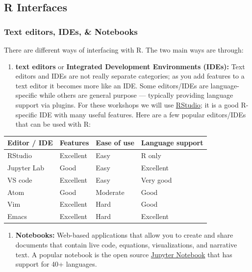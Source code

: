 \documentclass[]{book}
\providecommand{\tightlist}{%
  \setlength{\itemsep}{0pt}\setlength{\parskip}{0pt}}
\begin{document}
\hypertarget{r-interfaces}{%
\subsection{R Interfaces}\label{r-interfaces}}

\hypertarget{text-editors-ides-notebooks}{%
\subsubsection{Text editors, IDEs, \& Notebooks}\label{text-editors-ides-notebooks}}

There are different ways of interfacing with R. The two main ways are through:

\begin{enumerate}
\def\labelenumi{\arabic{enumi}.}
\tightlist
\item
  \textbf{text editors} or \textbf{Integrated Development Environments (IDEs):} Text editors and IDEs are not really separate categories; as you add features to a text editor it becomes more like an IDE. Some editors/IDEs are language-specific while others are general purpose --- typically providing language support via plugins. For these workshops we will use \href{https://rstudio.com/}{RStudio}; it is a good R-specific IDE with many useful features. Here are a few popular editors/IDEs that can be used with R:
\end{enumerate}

\begin{longtable}[]{@{}llll@{}}
\toprule
Editor / IDE & Features & Ease of use & Language support\tabularnewline
\midrule
\endhead
RStudio & Excellent & Easy & R only\tabularnewline
Jupyter Lab & Good & Easy & Excellent\tabularnewline
VS code & Excellent & Easy & Very good\tabularnewline
Atom & Good & Moderate & Good\tabularnewline
Vim & Excellent & Hard & Good\tabularnewline
Emacs & Excellent & Hard & Excellent\tabularnewline
\bottomrule
\end{longtable}

\begin{enumerate}
\def\labelenumi{\arabic{enumi}.}
\setcounter{enumi}{1}
\tightlist
\item
  \textbf{Notebooks:} Web-based applications that allow you to create and share documents that contain live code, equations, visualizations, and narrative text. A popular notebook is the open source \href{https://jupyter.org/}{Jupyter Notebook} that has support for 40+ languages.
\end{enumerate}
\end{document}
